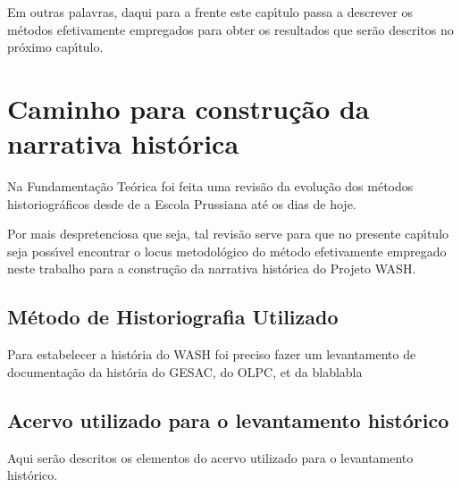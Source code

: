 \documentclass[
12pt,		%
openright,	%
twoside,  %
a4paper,			%
chapter=TITLE,		%
english,			%
french,				%
spanish,			%
brazil				%
]{USPSC-classe/USPSC_RedarTex}
\begin{document}
Em outras palavras, daqui para a frente este cap\'{\i}tulo passa a descrever os m\'etodos efetivamente empregados para obter os resultados que ser\~ao descritos no pr\'oximo cap\'{\i}tulo.








\section[Caminho para constru\c{c}\~ao da narrativa hist\'orica]{Caminho para constru\c{c}\~ao da narrativa hist\'orica}\label{Caminho para constru\c{c}\~ao da narrativa hist\'orica}
Na Fundamenta\c{c}\~ao Te\'orica foi feita uma revis\~ao da evolu\c{c}\~ao dos m\'etodos historiogr\'aficos desde de a Escola Prussiana at\'e os dias de hoje.








Por mais despretenciosa que seja, tal revis\~ao serve para que no presente cap\'{\i}tulo seja poss\'{\i}vel encontrar o locus metodol\'ogico do m\'etodo efetivamente empregado neste trabalho para a constru\c{c}\~ao da narrativa hist\'orica do Projeto WASH.








\subsection[M\'etodo de Historiografia Utilizado ]{M\'etodo de Historiografia Utilizado }\label{M\'etodo de Historiografia Utilizado }
Para estabelecer a hist\'oria do WASH foi preciso fazer um levantamento de documenta\c{c}\~ao da hist\'oria do GESAC, do OLPC, et da blablabla








\subsection[Acervo utilizado para o levantamento hist\'orico]{Acervo utilizado para o levantamento hist\'orico}\label{Acervo utilizado para o levantamento hist\'orico}
Aqui ser\~ao descritos os elementos do acervo utilizado para o levantamento hist\'orico.
\end{document}

